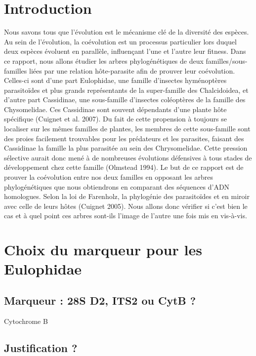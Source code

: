 \documentclass[a4paper, 12pt]{article}
\begin{document}
\section{Introduction}
Nous savons tous que l’évolution est le mécanisme clé de la diversité des espèces. Au sein de l’évolution, la coévolution est un processus particulier lors duquel deux espèces évoluent en parallèle, influençant l’une et l’autre leur fitness. Dans ce rapport, nous allons étudier les arbres phylogénétiques de deux familles/sous-familles liées par une relation hôte-parasite afin de prouver leur coévolution. Celles-ci sont d’une part Eulophidae, une famille d’insectes hyménoptères parasitoïdes et plus grands représentants de la super-famille des Chalcidoidea, et d’autre part Cassidinae, une sous-famille d’insectes coléoptères de la famille des Chysomelidae. Ces Cassidinae sont souvent dépendants d’une plante hôte spécifique (Cuignet et al. 2007). Du fait de cette propension à toujours se localiser sur les mêmes familles de plantes, les membres de cette sous-famille sont des proies facilement trouvables pour les prédateurs et les parasites, faisant des Cassidinae la famille la plus parasitée au sein des Chrysomelidae. Cette pression sélective aurait donc mené à de nombreuses évolutions défensives à tous stades de développement chez cette famille (Olmstead 1994).
Le but de ce rapport est de prouver la coévolution entre nos deux familles en opposant les arbres phylogénétiques que nous obtiendrons en comparant des séquences d’ADN homologues. Selon la loi de Farenholz, la phylogénie des parasitoïdes et en miroir avec celle de leurs hôtes (Cuignet 2005). Nous allons donc vérifier si c’est bien le cas et à quel point ces arbres sont-ils l’image de l’autre une fois mis en vis-à-vis.


\section{Choix du marqueur pour les Eulophidae}

\subsection{Marqueur : 28S D2, ITS2 ou CytB ?} 

\begin{large}
Cytochrome B
\end{large}

\subsection{Justification ?}
\end{document}
